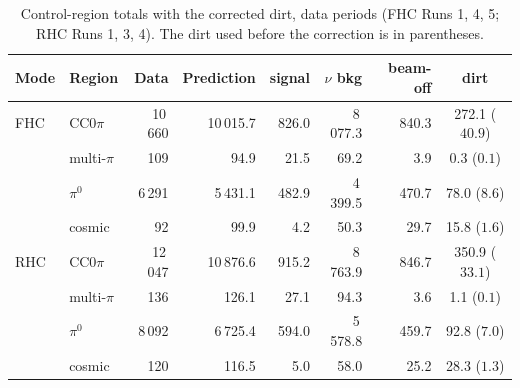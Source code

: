 \documentclass[11pt,a4paper]{article}
\begin{document}
\begin{table}[H]
  \centering
  \caption{Control-region totals with the corrected dirt, data periods (FHC Runs 1, 4, 5; RHC Runs 1, 3, 4). The
    dirt used before the correction is in parentheses.}
  \label{tab:yields_dirtfix}
  \small
  \begin{tabular}{llrrrrrc}
    \toprule
    Mode & Region & Data & Prediction & signal & $\nu$ bkg & beam-off & dirt \\
    \midrule
    FHC & CC$0\pi$    & 10\,660 & 10\,015.7 & 826.0 & 8\,077.3 & 840.3 & 272.1 ($40.9$) \\
        & multi-$\pi$ &     109 &      94.9 &  21.5 &     69.2 &   3.9 & 0.3 ($0.1$) \\
        & $\pi^0$     &  6\,291 &   5\,431.1 & 482.9 & 4\,399.5 & 470.7 & 78.0 ($8.6$) \\
        & cosmic      &      92 &      99.9 &   4.2 &     50.3 &  29.7 & 15.8 ($1.6$) \\
    \midrule
    RHC & CC$0\pi$    & 12\,047 & 10\,876.6 & 915.2 & 8\,763.9 & 846.7 & 350.9 ($33.1$) \\
        & multi-$\pi$ &     136 &     126.1 &  27.1 &     94.3 &   3.6 & 1.1 ($0.1$) \\
        & $\pi^0$     &  8\,092 &   6\,725.4 & 594.0 & 5\,578.8 & 459.7 & 92.8 ($7.0$) \\
        & cosmic      &     120 &     116.5 &   5.0 &     58.0 &  25.2 & 28.3 ($1.3$) \\
    \bottomrule
  \end{tabular}
\end{table}
\end{document}
